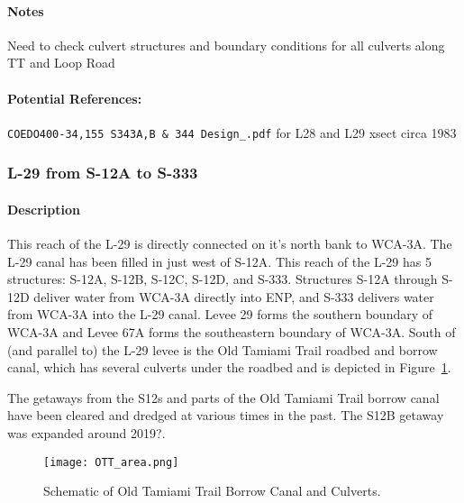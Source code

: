 \begin{notes}
\paragraph{Notes}
Need to check culvert structures and boundary conditions for all culverts along TT and Loop Road

\paragraph{Potential References:}
\begin{packed_items}
\item \verb$COEDO400-34,155 S343A,B & 344 Design_.pdf$ for L28 and L29 xsect circa 1983
\end{packed_items}
\end{notes}



\clearpage
\subsubsection{L-29 from S-12A to S-333}

\paragraph{Description}
This reach of the L-29 is directly connected on it's north bank to WCA-3A. The L-29 canal has been filled in just west of S-12A. This reach of the L-29 has 5 structures: S-12A, S-12B, S-12C, S-12D, and S-333. Structures S-12A through S-12D deliver water from WCA-3A directly into ENP, and S-333 delivers water from WCA-3A into the L-29 canal. Levee 29 forms the southern boundary of WCA-3A and Levee 67A forms the southeastern boundary of WCA-3A. South of (and parallel to) the L-29 levee is the Old Tamiami Trail roadbed and borrow canal, which has several culverts under the roadbed and is depicted in Figure~\ref{fig:OTT_area}.

The getaways from the S12s and parts of the Old Tamiami Trail borrow canal have been cleared and dredged at various times in the past. The S12B getaway was expanded around 2019?.

\begin{figure}[!h]
  \begin{center}
  \texttt{[image: OTT\_area.png]}
  \caption{Schematic of Old Tamiami Trail Borrow Canal and Culverts.}
  \label{fig:OTT_area}
  \end{center}
\end{figure}

